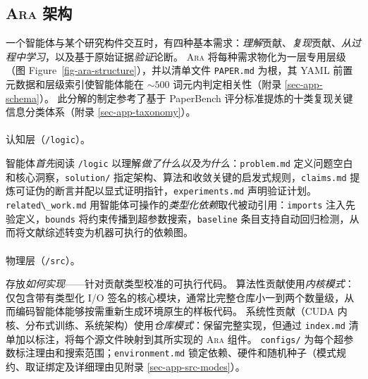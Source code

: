 \documentclass[
]{article}
\makeatletter
\let\oldparagraph\paragraph
\renewcommand{\paragraph}{
    \@ifstar
      \xxxParagraphStar
      \xxxParagraphNoStar
  }
\newcommand{\xxxParagraphStar}[1]{\oldparagraph*{#1}\mbox{}}
\newcommand{\xxxParagraphNoStar}[1]{\oldparagraph{#1}\mbox{}}
\newcommand{\passthrough}[1]{#1}
\theoremstyle{definition}
\newcommand{\ara}{\textsc{Ara}}
\makeatother
\begin{document}
\subsection{\texorpdfstring{\ara{} 架构}{ 架构}}\label{sec-layers}

一个智能体与某个研究构件交互时，有四种基本需求：\emph{理解}贡献、\emph{复现}贡献、\emph{从过程中学习}，以及基于原始证据\emph{验证}论断。
\ara{} 将每种需求物化为一层专用层级（图
Figure~\ref{fig-ara-structure}），并以清单文件
\passthrough{\lstinline!PAPER.md!} 为根，其 YAML
前置元数据和层级索引使智能体能在 \({\sim}500\) 词元内判定相关性（附录
\ref{sec-app-schema}）。 此分解的制定参考了基于 PaperBench
评分标准提炼的十类复现关键信息分类体系（附录 \ref{sec-app-taxonomy}）。

\paragraph{\texorpdfstring{认知层（\texttt{/logic}）。}{认知层（/logic）。}}\label{ux8ba4ux77e5ux5c42logic}

智能体\emph{首先}阅读 \passthrough{\lstinline!/logic!}
以理解\emph{做了什么以及为什么}：\passthrough{\lstinline!problem.md!}
定义问题空白和核心洞察，\passthrough{\lstinline!solution/!}
指定架构、算法和收敛关键的启发式规则，\passthrough{\lstinline!claims.md!}
提炼可证伪的断言并配以显式证明指针，\passthrough{\lstinline!experiments.md!}
声明验证计划。 \passthrough{\lstinline!related\_work.md!}
用智能体可操作的\emph{类型化依赖}取代被动引用：\passthrough{\lstinline!imports!}
注入先验定义，\passthrough{\lstinline!bounds!}
将约束传播到超参数搜索，\passthrough{\lstinline!baseline!}
条目支持自动回归检测，从而将文献综述转变为机器可执行的依赖图。

\paragraph{\texorpdfstring{物理层（\texttt{/src}）。}{物理层（/src）。}}\label{ux7269ux7406ux5c42src}

存放\emph{如何实现}------针对贡献类型校准的可执行代码。
算法性贡献使用\emph{内核模式}：仅包含带有类型化 I/O
签名的核心模块，通常比完整仓库小一到两个数量级，从而编码智能体能够按需重新生成环境原生的样板代码。
系统性贡献（CUDA
内核、分布式训练、系统架构）使用\emph{仓库模式}：保留完整实现，但通过
\passthrough{\lstinline!index.md!}
清单加以标注，将每个源文件映射到其所实现的 \ara{} 组件。
\passthrough{\lstinline!configs/!}
为每个超参数标注理由和搜索范围；\passthrough{\lstinline!environment.md!}
锁定依赖、硬件和随机种子（模式规约、取证绑定及详细理由见附录
\ref{sec-app-src-modes}）。
\end{document}
